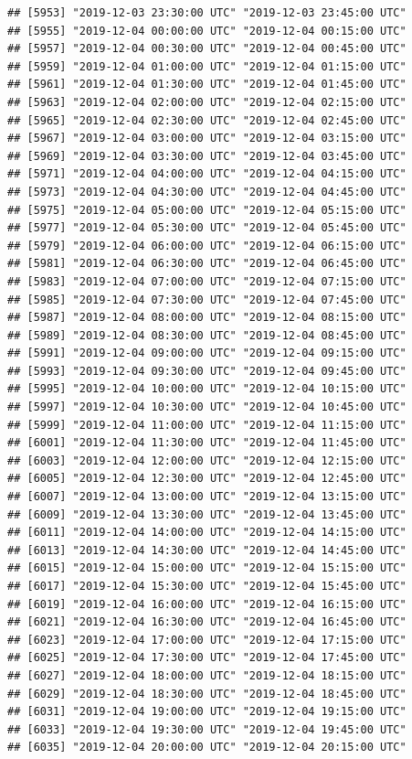 \documentclass{article}\usepackage[]{graphicx}\usepackage[]{color}
\makeatletter
\newenvironment{kframe}{%
 \def\at@end@of@kframe{}%
 \ifinner\ifhmode%
  \def\at@end@of@kframe{\end{minipage}}%
  \begin{minipage}{\columnwidth}%
 \fi\fi%
 \def\FrameCommand##1{\hskip\@totalleftmargin \hskip-\fboxsep
 \colorbox{shadecolor}{##1}\hskip-\fboxsep
     \hskip-\linewidth \hskip-\@totalleftmargin \hskip\columnwidth}%
 \MakeFramed {\advance\hsize-\width
   \@totalleftmargin\z@ \linewidth\hsize
   \@setminipage}}%
 {\par\unskip\endMakeFramed%
 \at@end@of@kframe}
\newenvironment{knitrout}{}{} %
\makeatother
\begin{document}
\begin{knitrout}
\begin{kframe}
\begin{verbatim}
## [5953] "2019-12-03 23:30:00 UTC" "2019-12-03 23:45:00 UTC"
## [5955] "2019-12-04 00:00:00 UTC" "2019-12-04 00:15:00 UTC"
## [5957] "2019-12-04 00:30:00 UTC" "2019-12-04 00:45:00 UTC"
## [5959] "2019-12-04 01:00:00 UTC" "2019-12-04 01:15:00 UTC"
## [5961] "2019-12-04 01:30:00 UTC" "2019-12-04 01:45:00 UTC"
## [5963] "2019-12-04 02:00:00 UTC" "2019-12-04 02:15:00 UTC"
## [5965] "2019-12-04 02:30:00 UTC" "2019-12-04 02:45:00 UTC"
## [5967] "2019-12-04 03:00:00 UTC" "2019-12-04 03:15:00 UTC"
## [5969] "2019-12-04 03:30:00 UTC" "2019-12-04 03:45:00 UTC"
## [5971] "2019-12-04 04:00:00 UTC" "2019-12-04 04:15:00 UTC"
## [5973] "2019-12-04 04:30:00 UTC" "2019-12-04 04:45:00 UTC"
## [5975] "2019-12-04 05:00:00 UTC" "2019-12-04 05:15:00 UTC"
## [5977] "2019-12-04 05:30:00 UTC" "2019-12-04 05:45:00 UTC"
## [5979] "2019-12-04 06:00:00 UTC" "2019-12-04 06:15:00 UTC"
## [5981] "2019-12-04 06:30:00 UTC" "2019-12-04 06:45:00 UTC"
## [5983] "2019-12-04 07:00:00 UTC" "2019-12-04 07:15:00 UTC"
## [5985] "2019-12-04 07:30:00 UTC" "2019-12-04 07:45:00 UTC"
## [5987] "2019-12-04 08:00:00 UTC" "2019-12-04 08:15:00 UTC"
## [5989] "2019-12-04 08:30:00 UTC" "2019-12-04 08:45:00 UTC"
## [5991] "2019-12-04 09:00:00 UTC" "2019-12-04 09:15:00 UTC"
## [5993] "2019-12-04 09:30:00 UTC" "2019-12-04 09:45:00 UTC"
## [5995] "2019-12-04 10:00:00 UTC" "2019-12-04 10:15:00 UTC"
## [5997] "2019-12-04 10:30:00 UTC" "2019-12-04 10:45:00 UTC"
## [5999] "2019-12-04 11:00:00 UTC" "2019-12-04 11:15:00 UTC"
## [6001] "2019-12-04 11:30:00 UTC" "2019-12-04 11:45:00 UTC"
## [6003] "2019-12-04 12:00:00 UTC" "2019-12-04 12:15:00 UTC"
## [6005] "2019-12-04 12:30:00 UTC" "2019-12-04 12:45:00 UTC"
## [6007] "2019-12-04 13:00:00 UTC" "2019-12-04 13:15:00 UTC"
## [6009] "2019-12-04 13:30:00 UTC" "2019-12-04 13:45:00 UTC"
## [6011] "2019-12-04 14:00:00 UTC" "2019-12-04 14:15:00 UTC"
## [6013] "2019-12-04 14:30:00 UTC" "2019-12-04 14:45:00 UTC"
## [6015] "2019-12-04 15:00:00 UTC" "2019-12-04 15:15:00 UTC"
## [6017] "2019-12-04 15:30:00 UTC" "2019-12-04 15:45:00 UTC"
## [6019] "2019-12-04 16:00:00 UTC" "2019-12-04 16:15:00 UTC"
## [6021] "2019-12-04 16:30:00 UTC" "2019-12-04 16:45:00 UTC"
## [6023] "2019-12-04 17:00:00 UTC" "2019-12-04 17:15:00 UTC"
## [6025] "2019-12-04 17:30:00 UTC" "2019-12-04 17:45:00 UTC"
## [6027] "2019-12-04 18:00:00 UTC" "2019-12-04 18:15:00 UTC"
## [6029] "2019-12-04 18:30:00 UTC" "2019-12-04 18:45:00 UTC"
## [6031] "2019-12-04 19:00:00 UTC" "2019-12-04 19:15:00 UTC"
## [6033] "2019-12-04 19:30:00 UTC" "2019-12-04 19:45:00 UTC"
## [6035] "2019-12-04 20:00:00 UTC" "2019-12-04 20:15:00 UTC"

\end{verbatim}
\end{kframe}
\end{knitrout}
\end{document}
